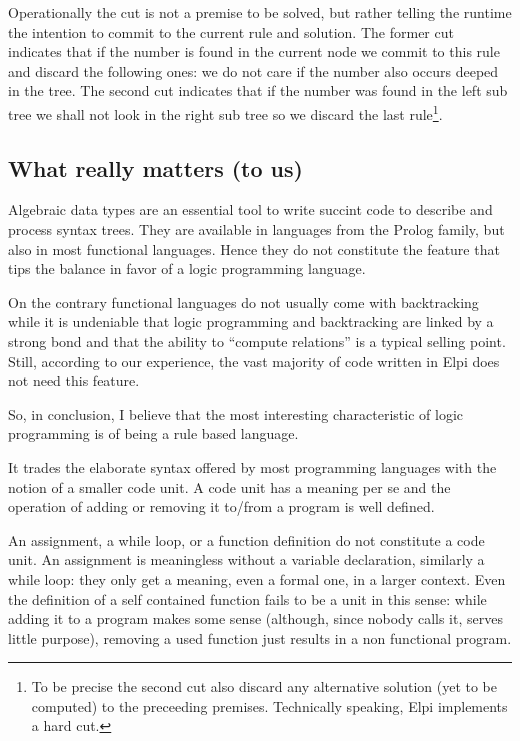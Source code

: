 \documentclass[a4paper, 11pt]{book}
\begin{document}
Operationally the cut is not a premise to be solved, but rather telling
the runtime the intention to commit to the current rule and solution.
The former cut indicates that if the number is found in the current node
we commit to this rule and discard the following ones: we do not care
if the number also occurs deeped in the tree. The second cut indicates
that if the number was found in the left sub tree we shall not look in
the right sub tree so we discard the last rule\footnote{To be precise
the second cut also discard any alternative solution (yet to be computed)
to the preceeding premises. Technically speaking, Elpi implements a hard cut.}.

\subsection{What really matters (to us)}

Algebraic data types are an essential tool to write succint code
to describe and process syntax trees. They are available in languages
from the Prolog family, but also in most functional languages. Hence they do
not constitute the feature that tips the balance in favor of a logic
programming language.

On the contrary functional languages do not usually come with backtracking
while it is undeniable that logic programming and backtracking are linked by
a strong bond and that the ability to ``compute relations'' is a typical
selling point. Still, according to our experience, the vast majority of code
written in Elpi does not need this feature.

So, in conclusion, I believe that the most interesting
characteristic of logic programming is of being a rule based language.

It trades the elaborate syntax offered by most
programming languages with the notion of a smaller code unit.
A code unit has a meaning per se and the operation of adding or removing it
to/from a program is well defined.

An assignment, a while loop, or a function definition do not
constitute a code unit. An assignment is meaningless without a variable
declaration, similarly a while loop: they only get a meaning, even a formal 
one, in a larger context. Even the definition of a self contained function fails to be a unit in
this sense: while adding it to a program makes some sense (although, since nobody
calls it, serves little purpose),
removing a used function just results in a non functional program.
\end{document}
